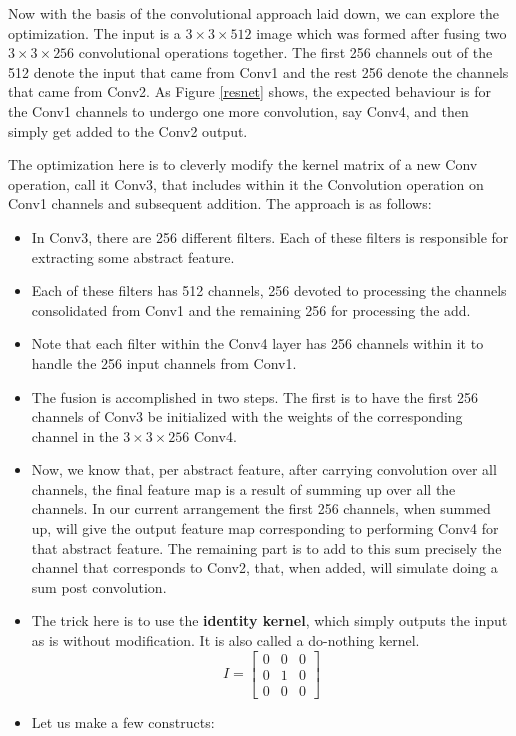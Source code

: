 \documentclass[12pt,a4paper,twoside,openright,bibliography=totocnumbered]{report}
\begin{document}
	Now with the basis of the convolutional approach laid down, we can explore the optimization. The input is a $3 \times 3 \times 512$ image which was formed after fusing two $3 \times 3 \times 256$ convolutional operations together. The first 256 channels out of the 512 denote the input that came from Conv1 and the rest 256 denote the channels that came from Conv2. As Figure \ref{resnet} shows, the expected behaviour is for the Conv1 channels to undergo one more convolution, say Conv4, and then simply get added to the Conv2 output.

	The optimization here is to cleverly modify the kernel matrix of a new Conv operation, call it Conv3, that includes within it the Convolution operation on Conv1 channels and subsequent addition. The approach is as follows:
	  \begin{itemize}
		\item In Conv3, there are 256 different filters. Each of these filters is responsible for extracting some abstract feature.
		\item Each of these filters has 512 channels, 256 devoted to processing the channels consolidated from Conv1 and the remaining 256 for processing the add.
		\item Note that each filter within the Conv4 layer has 256 channels within it to handle the 256 input channels from Conv1.
		\item The fusion is accomplished in two steps. The first is to have the first 256 channels of Conv3 be initialized with the weights of the corresponding channel in the $3 \times 3 \times 256$ Conv4.
		\item Now, we know that, per abstract feature, after carrying convolution over all channels, the final feature map is a result of summing up over all the channels. In our current arrangement the first 256 channels, when summed up, will give the output feature map corresponding to performing Conv4 for that abstract feature. The remaining part is to add to this sum precisely the channel that corresponds to Conv2, that, when added, will simulate doing a sum post convolution.
		\item The trick here is to use the \textbf{identity kernel}, which simply outputs the input as is without modification. It is also called a do-nothing kernel.
		\[ I = 
	\begin{bmatrix}
	0 & 0 & 0 \\
	0 & 1 & 0 \\
	0 & 0 & 0
	\end{bmatrix}
	\]
		\item Let us make a few constructs:

\end{itemize}
\end{document}
